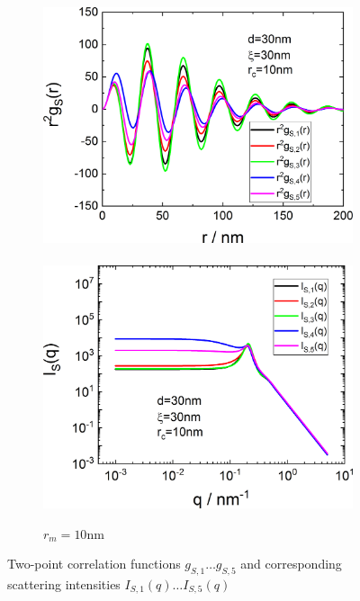 \begin{figure}[htb]
\begin{subfigure}[b]{.48\textwidth}
\begin{minipage}[b]{1\linewidth}
             \includegraphics[width=1\linewidth]{../images/form_factor/nonparticular/gyr2_10.png}\\~\\
             \includegraphics[width=1\linewidth]{../images/form_factor/nonparticular/IQCRW_10.png}
   \end{minipage}
   \caption{$r_m=10$nm}
   \label{fig:rm10nm}
\end{subfigure}
\caption{Two-point correlation functions $g_{S,1}\ldots g_{S,5}$ and corresponding scattering intensities $I_{S,1}(q)\ldots I_{S,5}(q)$} \label{fig:CRWplugin}
\end{figure}

